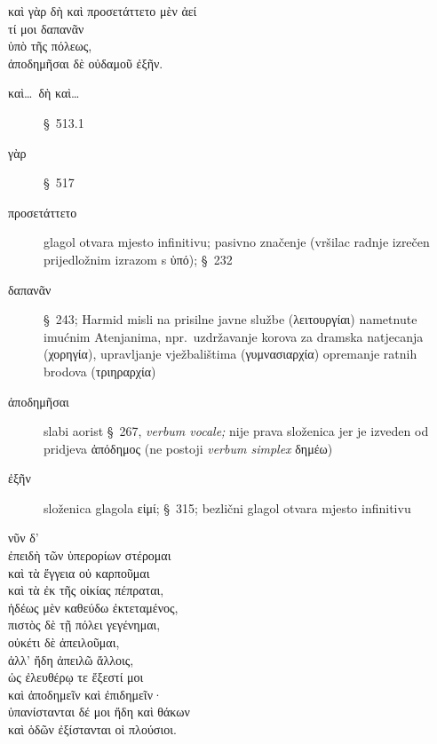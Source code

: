{\large
\begin{greek}
καὶ γὰρ δὴ καὶ προσετάττετο μὲν ἀεί \\
\tabto{2em} τί μοι δαπανᾶν \\
\tabto{2em} ὑπὸ τῆς πόλεως, \\
ἀποδημῆσαι δὲ οὐδαμοῦ ἐξῆν.\\

\end{greek}
}

\begin{description}
\item[καὶ\dots\ δὴ καὶ\dots] §~513.1
\item[γὰρ] §~517
\item[προσετάττετο] glagol otvara mjesto infinitivu; pasivno značenje (vršilac radnje izrečen prijedložnim izrazom s ὑπό); §~232
\item[δαπανᾶν] §~243; Harmid misli na prisilne javne službe (λειτουργίαι) nametnute imućnim Atenjanima, npr.\ uzdržavanje korova za dramska natjecanja (χορηγία), upravljanje vježbalištima (γυμνασιαρχία) opremanje ratnih brodova (τριηραρχία)
\item[ἀποδημῆσαι] slabi aorist §~267, \textit{verbum vocale;} nije prava složenica jer je izveden od pridjeva ἀπόδημος (ne postoji \textit{verbum simplex} δημέω)
\item[ἐξῆν] složenica glagola εἰμί; §~315; bezlični glagol otvara mjesto infinitivu
\end{description}


{\large
\begin{greek}
\noindent νῦν δ' \\
ἐπειδὴ τῶν ὑπερορίων στέρομαι \\
\tabto{2em} καὶ τὰ ἔγγεια οὐ καρποῦμαι \\
\tabto{2em} καὶ τὰ ἐκ τῆς οἰκίας πέπραται, \\
ἡδέως μὲν καθεύδω ἐκτεταμένος, \\
πιστὸς δὲ τῇ πόλει γεγένημαι, \\
οὐκέτι δὲ ἀπειλοῦμαι, \\
ἀλλ' ἤδη ἀπειλῶ ἄλλοις, \\
ὡς ἐλευθέρῳ τε ἔξεστί μοι \\
\tabto{2em} καὶ ἀποδημεῖν καὶ ἐπιδημεῖν· \\
ὑπανίστανται δέ μοι ἤδη καὶ θάκων \\
καὶ ὁδῶν ἐξίστανται οἱ πλούσιοι.\\

\end{greek}
}

